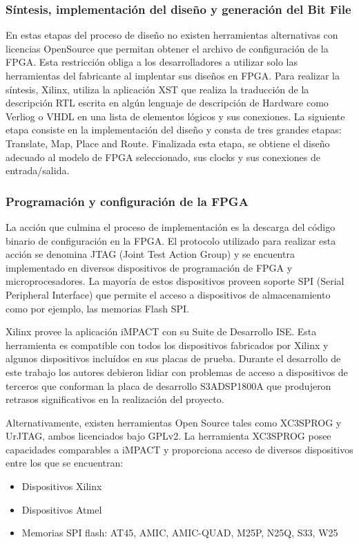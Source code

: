 				\subsubsection {Síntesis, implementación del diseño y generación del Bit File}
				En estas etapas del proceso de diseño no existen herramientas alternativas con licencias OpenSource que permitan obtener el archivo de
				configuración de la FPGA. Esta restricción obliga a los desarrolladores a utilizar solo las herramientas del fabricante al implentar sus diseños
				en FPGA.
				Para realizar la síntesis, Xilinx, utiliza la aplicación XST que realiza la traducción de la descripción RTL escrita en algún lenguaje de
				descripción de Hardware como Verliog o VHDL en una lista de elementos lógicos y sus conexiones. La siguiente etapa consiste en la implementación 
				del diseño y consta de tres grandes etapas: Translate, Map, Place and Route. Finalizada esta etapa, se obtiene el diseño adecuado al modelo de FPGA seleccionado, sus clocks y sus conexiones de entrada/salida. 
				
				\subsubsection {Programación y configuración de la FPGA}
				La acción que culmina el proceso de implementación es la descarga del código binario de configuración en la FPGA. El protocolo utilizado para
				realizar esta acción se denomina JTAG (Joint Test Action Group) y se encuentra implementado en diversos dispositivos de programación de FPGA y
				microprocesadores. La mayoría de estos dispositivos proveen soporte SPI (Serial Peripheral Interface) que permite el acceso a dispositivos de
				almacenamiento como por ejemplo, las memorias Flash SPI.
				
				Xilinx provee la aplicación iMPACT con su Suite de Desarrollo ISE. Esta herramienta es compatible con todos los dispositivos fabricados por
				Xilinx y algunos dispositivos incluídos en sus placas de prueba. Durante el desarrollo de este trabajo los autores debieron lidiar con
				problemas de acceso a dispositivos de terceros que conforman la placa de desarrollo S3ADSP1800A que produjeron retrasos significativos en la
				realización del proyecto.
 				
 				Alternativamente, existen herramientas Open Source tales como XC3SPROG y UrJTAG, ambos licenciados bajo GPLv2. La herramienta XC3SPROG
 				posee capacidades comparables a iMPACT y proporciona acceso de diversos dispositivos entre los que se encuentran:
 				\begin{itemize}
 				  \item Dispositivos Xilinx
				  \item Dispositivos Atmel 
				  \item Memorias SPI flash: AT45, AMIC, AMIC-QUAD, M25P, N25Q, S33, W25
 				\end{itemize}
 				 
